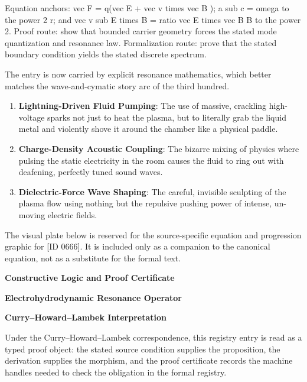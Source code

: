Equation anchors: vec F = q(vec E + vec v times vec B ); a sub c = omega to the power 2 r; and vec v sub E times B = ratio vec E times vec B B to the power 2. Proof route: show that bounded carrier geometry forces the stated mode quantization and resonance law. Formalization route: prove that the stated boundary condition yields the stated discrete spectrum.

The entry is now carried by explicit resonance mathematics, which better matches the wave-and-cymatic story arc of the third hundred.
\endgroup

\begin{enumerate}[leftmargin=1.6em,itemsep=6pt,topsep=4pt]
\item \textbf{Lightning-Driven Fluid Pumping}: The use of massive, crackling high-voltage sparks not just to heat the plasma, but to literally grab the liquid metal and violently shove it around the chamber like a physical paddle.
\item \textbf{Charge-Density Acoustic Coupling}: The bizarre mixing of physics where pulsing the static electricity in the room causes the fluid to ring out with deafening, perfectly tuned sound waves.
\item \textbf{Dielectric-Force Wave Shaping}: The careful, invisible sculpting of the plasma flow using nothing but the repulsive pushing power of intense, un-moving electric fields.
\end{enumerate}

\begingroup\footnotesize\sloppy
The visual plate below is reserved for the source-specific equation and progression graphic for [ID 0666]. It is included only as a companion to the canonical equation, not as a substitute for the formal text.
\par\endgroup
\ifTZPDarkEdition
{}
\fi

\clearpage
\begingroup\tzpsupportsetup
\noindent\textbf{\fontsize{10.8pt}{12.8pt}\selectfont [ID 0666] Constructive Logic and Proof Certificate}\par
\noindent\textbf{\fontsize{10pt}{12pt}\selectfont Electrohydrodynamic Resonance Operator}\par
\vspace{0.45em}
\begingroup
\footnotesize
\setlength{\parskip}{0.22em}
\setlength{\parindent}{0pt}
\noindent\textbf{Curry--Howard--Lambek Interpretation}\par
Under the Curry--Howard--Lambek correspondence, this registry entry is read as a typed proof
object: the stated source condition supplies the proposition, the derivation supplies the
morphism, and the proof certificate records the machine handles needed to check the obligation
in the formal registry.


